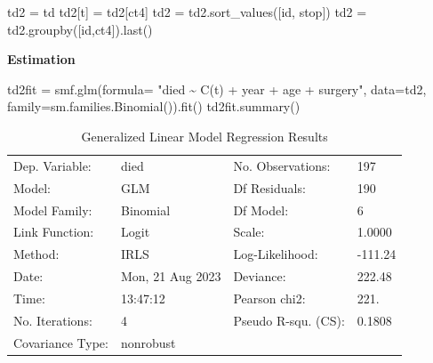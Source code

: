 \documentclass[
  12pt,
  letterpaper,
  DIV=11,
  numbers=noendperiod,
  onepage,
  openany]{scrreprt}
\newenvironment{Shaded}{\begin{snugshade}}{\end{snugshade}}
\newcommand{\NormalTok}[1]{\textcolor[rgb]{0.80,0.80,0.80}{#1}}
\newcommand{\OperatorTok}[1]{\textcolor[rgb]{0.94,0.94,0.82}{#1}}
\newcommand{\StringTok}[1]{\textcolor[rgb]{0.80,0.58,0.58}{#1}}
\begin{document}
\begin{Shaded}
\begin{Highlighting}[]
\NormalTok{td2 }\OperatorTok{=}\NormalTok{ td }
\NormalTok{td2[}\StringTok{\textquotesingle{}t\textquotesingle{}}\NormalTok{] }\OperatorTok{=}\NormalTok{ td2[}\StringTok{\textquotesingle{}ct4\textquotesingle{}}\NormalTok{]}
\NormalTok{td2 }\OperatorTok{=}\NormalTok{ td2.sort\_values([}\StringTok{\textquotesingle{}id\textquotesingle{}}\NormalTok{, }\StringTok{\textquotesingle{}stop\textquotesingle{}}\NormalTok{])}
\NormalTok{td2 }\OperatorTok{=}\NormalTok{  td2.groupby([}\StringTok{\textquotesingle{}id\textquotesingle{}}\NormalTok{,}\StringTok{\textquotesingle{}ct4\textquotesingle{}}\NormalTok{]).last()}
\end{Highlighting}
\end{Shaded}

\textbf{Estimation}

\begin{Shaded}
\begin{Highlighting}[]
\NormalTok{td2fit }\OperatorTok{=}\NormalTok{ smf.glm(formula}\OperatorTok{=}  \StringTok{"died \textasciitilde{} C(t) +  year + age + surgery"}\NormalTok{, data}\OperatorTok{=}\NormalTok{td2, family}\OperatorTok{=}\NormalTok{sm.families.Binomial()).fit()}
\NormalTok{td2fit.summary()}
\end{Highlighting}
\end{Shaded}

\begin{longtable}[]{@{}llll@{}}
\caption{Generalized Linear Model Regression Results}\tabularnewline
\toprule\noalign{}
\endfirsthead
\endhead
\bottomrule\noalign{}
\endlastfoot
Dep. Variable: & died & No. Observations: & 197 \\
Model: & GLM & Df Residuals: & 190 \\
Model Family: & Binomial & Df Model: & 6 \\
Link Function: & Logit & Scale: & 1.0000 \\
Method: & IRLS & Log-Likelihood: & -111.24 \\
Date: & Mon, 21 Aug 2023 & Deviance: & 222.48 \\
Time: & 13:47:12 & Pearson chi2: & 221. \\
No. Iterations: & 4 & Pseudo R-squ. (CS): & 0.1808 \\
Covariance Type: & nonrobust & & \\
\end{longtable}
\end{document}
